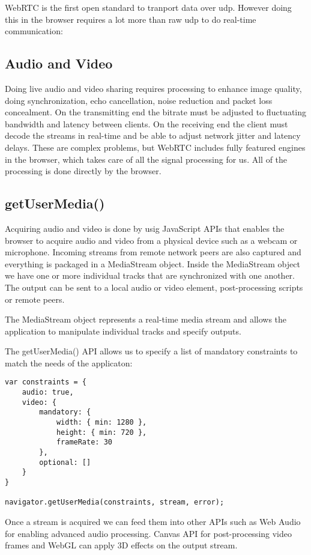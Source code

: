 WebRTC is the first open standard to tranport data over \gls{udp}. However doing this in the browser requires a lot more than raw \gls{udp} to do real-time communication:

\subsection{Audio and Video}
Doing live audio and video sharing requires processing to enhance image quality, doing synchronization, echo cancellation, noise reduction and packet loss concealment\cite{Grigorik2013High}. On the transmitting end the bitrate must be adjusted to fluctuating bandwidth and latency between clients. On the receiving end the client must decode the streams in real-time and be able to adjust network jitter and latency delays. These are complex problems, but WebRTC includes fully featured engines in the browser, which takes care of all the signal processing for us. All of the processing is done directly by the browser.

\subsection{getUserMedia()}
Acquiring audio and video is done by usig JavaScript APIs that enables the browser to acquire audio and video from a physical device such as a webcam or microphone. Incoming streams from remote network peers are also captured and everything is packaged in a MediaStream object. Inside the MediaStream object we have one or more individual tracks that are synchronized with one another. The output can be sent to a local audio or video element, post-processing scripts or remote peers.

The MediaStream object represents a real-time media stream and allows the application to manipulate individual tracks and specify outputs.


The getUserMedia() API allows us to specify a list of mandatory constraints to match the needs of the applicaton:

\lstset{language=Javascript} 
\begin{lstlisting}
var constraints = {
	audio: true,
	video: {
		mandatory: {
			width: { min: 1280 },
			height: { min: 720 },
			frameRate: 30
		},
		optional: []
	}
}

navigator.getUserMedia(constraints, stream, error);
\end{lstlisting}

Once a stream is acquired we can feed them into other APIs such as Web Audio for enabling advanced audio processing. Canvas API for post-processing video frames and WebGL can apply 3D effects on the output stream.


